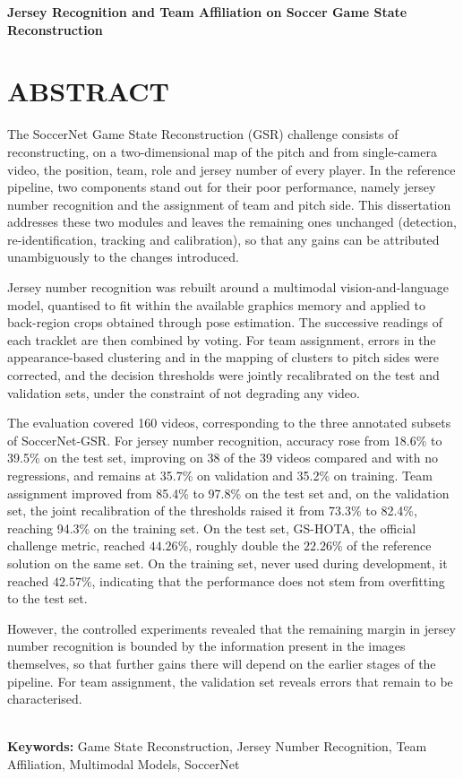 \begingroup
\begin{flushleft}
\bfseries
{}
{\Large
Jersey Recognition and Team Affiliation on Soccer Game State Reconstruction}

\mdseries
\end{flushleft}
\normalsize
\let\clearpage\relax
\chapter{ABSTRACT}
\endgroup

\noindent The SoccerNet Game State Reconstruction (GSR) challenge consists of
reconstructing, on a two-dimensional map of the pitch and from single-camera video, the
position, team, role and jersey number of every player. In the reference pipeline, two
components stand out for their poor performance, namely jersey number recognition and the
assignment of team and pitch side. This dissertation addresses these two modules and
leaves the remaining ones unchanged (detection, re-identification, tracking and
calibration), so that any gains can be attributed unambiguously to the changes introduced.

Jersey number recognition was rebuilt around a multimodal vision-and-language model,
quantised to fit within the available graphics memory and applied to back-region crops
obtained through pose estimation. The successive readings of each tracklet are then
combined by voting. For team assignment, errors in the appearance-based clustering and in
the mapping of clusters to pitch sides were corrected, and the decision thresholds were
jointly recalibrated on the test and validation sets, under the constraint of not
degrading any video.

The evaluation covered 160 videos, corresponding to the three annotated subsets of
SoccerNet-GSR. For jersey number recognition, accuracy rose from 18.6\% to 39.5\% on the
test set, improving on 38 of the 39 videos compared and with no regressions, and remains
at 35.7\% on validation and 35.2\% on training. Team assignment improved from 85.4\% to
97.8\% on the test set and, on the validation set, the joint recalibration of the
thresholds raised it from 73.3\% to 82.4\%, reaching 94.3\% on the training set. On the
test set, GS-HOTA, the official challenge metric, reached $44.26\%$, roughly double the $22.26\%$ of the reference solution on the same set. On the training set, never used during development, it reached $42.57\%$, indicating that the performance does not stem from
overfitting to the test set.

However, the controlled experiments revealed that the remaining margin in jersey number recognition is bounded by the information present in the images themselves, so that further gains there will depend on the earlier stages of the pipeline. For team assignment, the validation set reveals errors that remain to be characterised.

\hspace{3cm}\\
\indent
\textbf{Keywords: } Game State Reconstruction, Jersey Number Recognition, Team Affiliation,
Multimodal Models, SoccerNet
